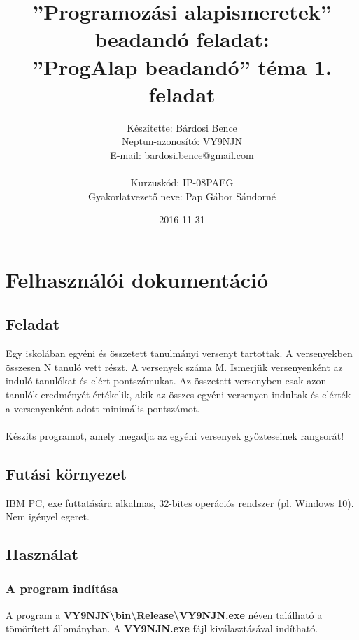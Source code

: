 \documentclass[a4paper]{article}
\title{”Programozási alapismeretek”\\ beadandó feladat:\\ ”ProgAlap beadandó” téma 1. feladat}
\date{2016-11-31}
\author{Készítette: Bárdosi Bence\\ Neptun-azonosító: VY9NJN\\ E-mail: bardosi.bence@gmail.com\\\\ Kurzuskód: IP-08PAEG\\ Gyakorlatvezető neve: Pap Gábor Sándorné}
\begin{document}
  \maketitle
  \newpage

  \tableofcontents
  \newpage

  \section{Felhasználói dokumentáció}
    \subsection{Feladat}
      Egy iskolában egyéni és összetett tanulmányi versenyt tartottak.
      A versenyekben összesen N tanuló vett részt. A versenyek száma M.
      Ismerjük versenyenként az induló tanulókat és elért pontszámukat.
      Az összetett versenyben csak azon tanulók eredményét értékelik,
      akik az összes egyéni versenyen indultak és elérték a versenyenként adott minimális pontszámot.
      \\
      \\ Készíts programot, amely megadja az egyéni versenyek győzteseinek rangsorát!
    \subsection{Futási környezet}
      IBM PC, exe futtatására alkalmas, 32-bites operációs rendszer (pl. Windows 10). Nem igényel egeret.
    \subsection{Használat}
      \subsubsection{A program indítása}
        A program a \textbf{VY9NJN\textbackslash bin\textbackslash Release\textbackslash VY9NJN.exe} néven található a tömörített állományban. A \textbf{VY9NJN.exe} fájl kiválasztásával indítható.
\end{document}
